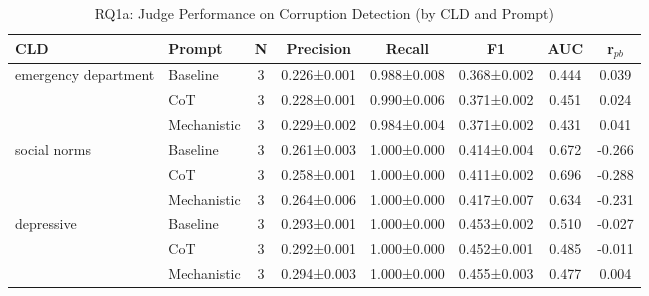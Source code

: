 \begin{table}[htbp]
\centreing
\caption{RQ1a: Judge Performance on Corruption Detection (by CLD and Prompt)}
\label{tab:rq1a_main}
\begin{tabular}{llcccccc}
\toprule
\textbf{CLD} & \textbf{Prompt} & \textbf{N} & \textbf{Precision} & \textbf{Recall} & \textbf{F1} & \textbf{AUC} & \textbf{r$_{pb}$} \\
\midrule
emergency department & Baseline & 3 & 0.226±0.001 & 0.988±0.008 & 0.368±0.002 & 0.444 & 0.039 \\
 & CoT & 3 & 0.228±0.001 & 0.990±0.006 & 0.371±0.002 & 0.451 & 0.024 \\
 & Mechanistic & 3 & 0.229±0.002 & 0.984±0.004 & 0.371±0.002 & 0.431 & 0.041 \\
\midrule
social norms & Baseline & 3 & 0.261±0.003 & 1.000±0.000 & 0.414±0.004 & 0.672 & -0.266 \\
 & CoT & 3 & 0.258±0.001 & 1.000±0.000 & 0.411±0.002 & 0.696 & -0.288 \\
 & Mechanistic & 3 & 0.264±0.006 & 1.000±0.000 & 0.417±0.007 & 0.634 & -0.231 \\
\midrule
depressive & Baseline & 3 & 0.293±0.001 & 1.000±0.000 & 0.453±0.002 & 0.510 & -0.027 \\
 & CoT & 3 & 0.292±0.001 & 1.000±0.000 & 0.452±0.001 & 0.485 & -0.011 \\
 & Mechanistic & 3 & 0.294±0.003 & 1.000±0.000 & 0.455±0.003 & 0.477 & 0.004 \\
\midrule
\bottomrule
\end{tabular}
\end{table}